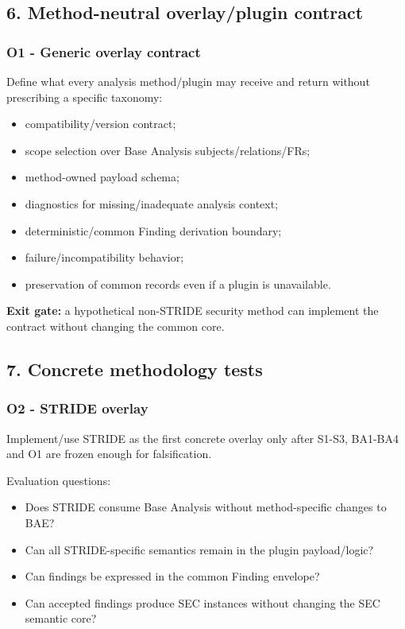 \documentclass[
  11pt,
  a4paper,
]{article}
\providecommand{\tightlist}{%
  \setlength{\itemsep}{0pt}\setlength{\parskip}{0pt}}
\begin{document}
\subsection{6. Method-neutral overlay/plugin
contract}\label{method-neutral-overlayplugin-contract}

\subsubsection{O1 - Generic overlay
contract}\label{o1---generic-overlay-contract}

Define what every analysis method/plugin may receive and return without
prescribing a specific taxonomy:

\begin{itemize}
\tightlist
\item
  compatibility/version contract;
\item
  scope selection over Base Analysis subjects/relations/FRs;
\item
  method-owned payload schema;
\item
  diagnostics for missing/inadequate analysis context;
\item
  deterministic/common Finding derivation boundary;
\item
  failure/incompatibility behavior;
\item
  preservation of common records even if a plugin is unavailable.
\end{itemize}

\textbf{Exit gate:} a hypothetical non-STRIDE security method can
implement the contract without changing the common core.

\subsection{7. Concrete methodology
tests}\label{concrete-methodology-tests}

\subsubsection{O2 - STRIDE overlay}\label{o2---stride-overlay}

Implement/use STRIDE as the first concrete overlay only after S1-S3,
BA1-BA4 and O1 are frozen enough for falsification.

Evaluation questions:

\begin{itemize}
\tightlist
\item
  Does STRIDE consume Base Analysis without method-specific changes to
  BAE?
\item
  Can all STRIDE-specific semantics remain in the plugin payload/logic?
\item
  Can findings be expressed in the common Finding envelope?
\item
  Can accepted findings produce SEC instances without changing the SEC
  semantic core?
\end{itemize}
\end{document}
